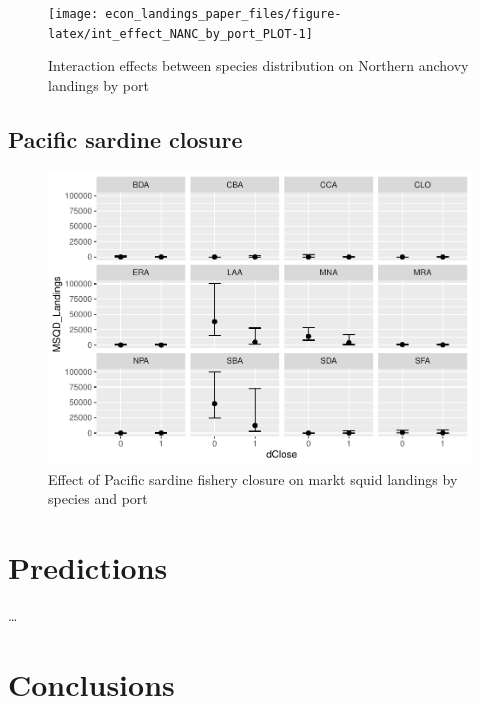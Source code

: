 \begin{Schunk}
\begin{figure}
\texttt{[image: econ\_landings\_paper\_files/figure-latex/int\_effect\_NANC\_by\_port\_PLOT-1]} \caption{Interaction effects between species distribution on Northern anchovy landings by port\label{fig:sdm_int_nanc}}\label{fig:int_effect_NANC_by_port_PLOT}
\end{figure}
\end{Schunk}

\hypertarget{pacific-sardine-closure}{%
\subsection{Pacific sardine closure}\label{pacific-sardine-closure}}

\begin{Schunk}
\begin{figure}
\includegraphics{econ_landings_paper_files/figure-latex/by_port_msqd_dclose-1} \caption{Effect of Pacific sardine fishery closure on markt squid landings by species and  port\label{fig:sdmeffects}}\label{fig:by_port_msqd_dclose}
\end{figure}
\end{Schunk}

\hypertarget{predictions}{%
\section{Predictions}\label{predictions}}

\ldots{}

\hypertarget{conclusions}{%
\section{Conclusions}\label{conclusions}}

